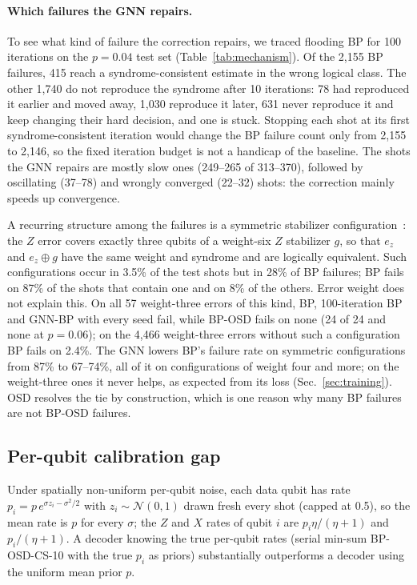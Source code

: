 \documentclass[a4paper,twocolumn,11pt,nopdfoutputerror]{quantumarticle}
\begin{document}
\paragraph{Which failures the GNN repairs.} To see what kind of failure
the correction repairs, we traced flooding BP for 100 iterations on the
$p=0.04$ test set (Table~\ref{tab:mechanism}). Of the 2{,}155 BP
failures, 415 reach a syndrome-consistent estimate in the wrong logical
class. The other 1{,}740 do not reproduce the syndrome after 10
iterations: 78 had reproduced it earlier and moved away, 1{,}030
reproduce it later, 631 never reproduce it and keep changing their hard
decision, and one is stuck. Stopping each shot at its first
syndrome-consistent iteration would change the BP failure count only from
2{,}155 to 2{,}146, so the fixed iteration budget is not a handicap of the
baseline. The shots the GNN repairs are mostly slow ones (249--265 of
313--370), followed by oscillating (37--78) and wrongly converged
(22--32) shots: the correction mainly speeds up convergence.

A recurring structure among the failures is a symmetric stabilizer
configuration~\cite{Raveendran2021Trapping}: the $Z$ error covers exactly
three qubits of a weight-six $Z$ stabilizer $g$, so that $e_z$ and
$e_z\oplus g$ have the same weight and syndrome and are logically
equivalent. Such configurations occur in 3.5\% of the test shots but in
28\% of BP failures; BP fails on 87\% of the shots that contain one and on
8\% of the others. Error weight does not explain this. On all
57 weight-three errors of this kind, BP, 100-iteration BP and GNN-BP with
every seed fail, while BP-OSD fails on none (24 of 24 and none at
$p=0.06$); on the 4{,}466 weight-three errors without such a
configuration BP fails on 2.4\%. The GNN lowers BP's failure rate on
symmetric configurations from 87\% to 67--74\%, all of it on configurations of
weight four and more; on the weight-three ones it never helps, as expected
from its loss (Sec.~\ref{sec:training}). OSD resolves the tie by
construction, which is one reason why many BP failures are not BP-OSD
failures.

\subsection{Per-qubit calibration gap}\label{sec:oraclegap}

Under spatially non-uniform per-qubit noise, each data qubit has rate
$p_i=p\,e^{\sigma z_i-\sigma^2/2}$ with $z_i\sim\mathcal N(0,1)$ drawn
fresh every shot (capped at 0.5), so the mean rate is $p$ for every
$\sigma$; the $Z$ and $X$ rates of qubit $i$ are $p_i\eta/(\eta+1)$ and
$p_i/(\eta+1)$. A decoder knowing the true per-qubit rates (serial min-sum
BP-OSD-CS-10 with the true $p_i$ as priors) substantially outperforms a
decoder using the uniform mean prior $p$.
\end{document}
